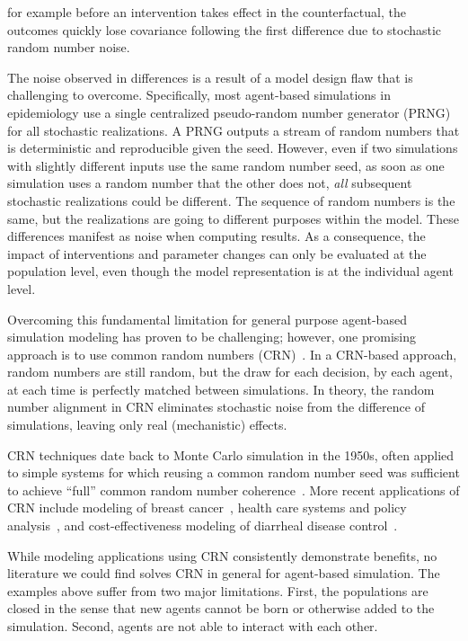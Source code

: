 \documentclass[10pt,letterpaper]{article}
\begin{document}
for example before an intervention takes effect in the counterfactual, the outcomes quickly lose covariance following the first difference due to stochastic random number noise.

The noise observed in differences is a result of a model design flaw that is challenging to overcome. Specifically, most agent-based simulations in epidemiology use a single centralized pseudo-random number generator (PRNG) for all stochastic realizations. A PRNG outputs a stream of random numbers that is deterministic and reproducible given the seed. However, even if two simulations with slightly different inputs use the same random number seed, as soon as one simulation uses a random number that the other does not, \textit{all} subsequent stochastic realizations could be different. The sequence of random numbers is the same, but the realizations are going to different purposes within the model. These differences manifest as noise when computing results. As a consequence, the impact of interventions and parameter changes can only be evaluated at the population level, even though the model representation is at the individual agent level.

Overcoming this fundamental limitation for general purpose agent-based simulation modeling has proven to be challenging; however, one promising approach is to use common random numbers (CRN)~\cite{kleijnen1974statistical}.  In a CRN-based approach, random numbers are still random, but the draw for each decision, by each agent, at each time is perfectly matched between simulations. In theory, the random number alignment in CRN eliminates stochastic noise from the difference of simulations, leaving only real (mechanistic) effects.

CRN techniques date back to Monte Carlo simulation in the 1950s, often applied to simple systems for which reusing a common random number seed was sufficient to achieve ``full'' common random number coherence~\cite{heikes_using_1976, conway_tactical_1963}. More recent applications of CRN include modeling of breast cancer~\cite{stout_keeping_2008}, health care systems and policy analysis~\cite{murphy_using_2013, cornejo_creating_2014}, and cost-effectiveness modeling of diarrheal disease control~\cite{flaxman_untangling_2017}.

While modeling applications using CRN consistently demonstrate benefits, no literature we could find solves CRN in general for agent-based simulation. The examples above suffer from two major limitations. First, the populations are closed in the sense that new agents cannot be born or otherwise added to the simulation. Second, agents are not able to interact with each other.
\end{document}
